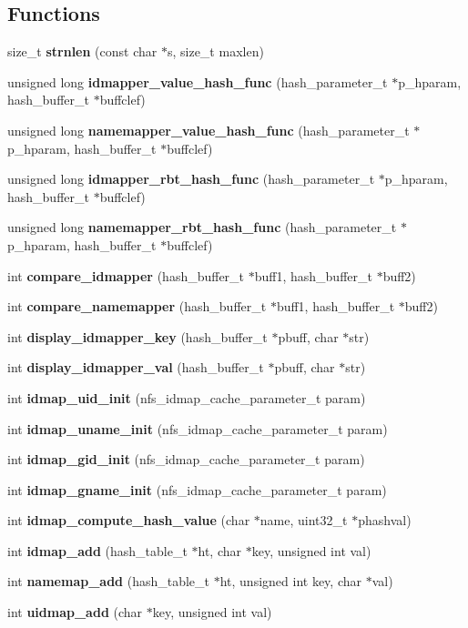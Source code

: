 \subsection*{Functions}
\begin{CompactItemize}
\item 
size\_\-t {\bf strnlen} (const char $\ast$s, size\_\-t maxlen)
\item 
unsigned long {\bf idmapper\_\-value\_\-hash\_\-func} (hash\_\-parameter\_\-t $\ast$p\_\-hparam, hash\_\-buffer\_\-t $\ast$buffclef)
\item 
unsigned long {\bf namemapper\_\-value\_\-hash\_\-func} (hash\_\-parameter\_\-t $\ast$p\_\-hparam, hash\_\-buffer\_\-t $\ast$buffclef)
\item 
unsigned long {\bf idmapper\_\-rbt\_\-hash\_\-func} (hash\_\-parameter\_\-t $\ast$p\_\-hparam, hash\_\-buffer\_\-t $\ast$buffclef)
\item 
unsigned long {\bf namemapper\_\-rbt\_\-hash\_\-func} (hash\_\-parameter\_\-t $\ast$p\_\-hparam, hash\_\-buffer\_\-t $\ast$buffclef)
\item 
int {\bf compare\_\-idmapper} (hash\_\-buffer\_\-t $\ast$buff1, hash\_\-buffer\_\-t $\ast$buff2)
\item 
int {\bf compare\_\-namemapper} (hash\_\-buffer\_\-t $\ast$buff1, hash\_\-buffer\_\-t $\ast$buff2)
\item 
int {\bf display\_\-idmapper\_\-key} (hash\_\-buffer\_\-t $\ast$pbuff, char $\ast$str)
\item 
int {\bf display\_\-idmapper\_\-val} (hash\_\-buffer\_\-t $\ast$pbuff, char $\ast$str)
\item 
int {\bf idmap\_\-uid\_\-init} (nfs\_\-idmap\_\-cache\_\-parameter\_\-t param)
\item 
int {\bf idmap\_\-uname\_\-init} (nfs\_\-idmap\_\-cache\_\-parameter\_\-t param)
\item 
int {\bf idmap\_\-gid\_\-init} (nfs\_\-idmap\_\-cache\_\-parameter\_\-t param)
\item 
int {\bf idmap\_\-gname\_\-init} (nfs\_\-idmap\_\-cache\_\-parameter\_\-t param)
\item 
int {\bf idmap\_\-compute\_\-hash\_\-value} (char $\ast$name, uint32\_\-t $\ast$phashval)
\item 
int {\bf idmap\_\-add} (hash\_\-table\_\-t $\ast$ht, char $\ast$key, unsigned int val)
\item 
int {\bf namemap\_\-add} (hash\_\-table\_\-t $\ast$ht, unsigned int key, char $\ast$val)
\item 
int {\bf uidmap\_\-add} (char $\ast$key, unsigned int val)

\end{CompactItemize}
